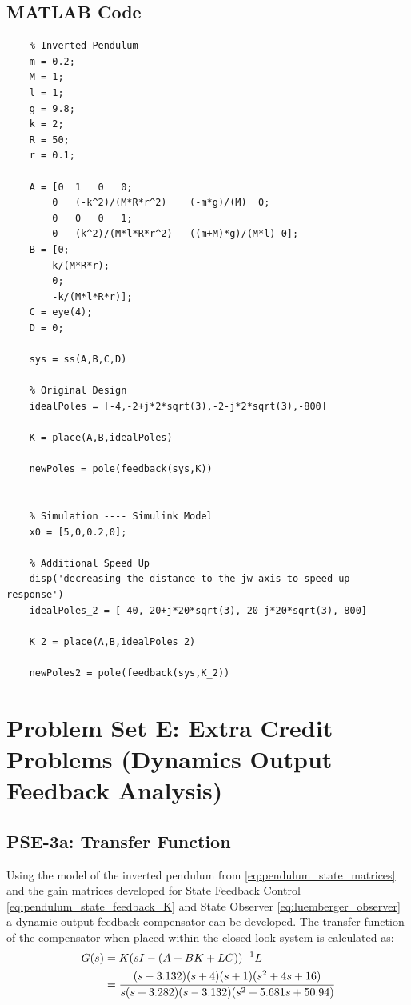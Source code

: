 \documentclass[]{article}
\begin{document}
	\subsection{MATLAB Code}
		\label{apx:PSD_MATLAB}
		\begin{Verbatim}[tabsize=4]
	% MECH 6300 - Problem Set D
	% Inverted Pendulum
	m = 0.2;
	M = 1;
	l = 1;
	g = 9.8;
	k = 2;
	R = 50;
	r = 0.1;
	
	A = [0  1   0   0;
		0   (-k^2)/(M*R*r^2)    (-m*g)/(M)  0;
		0   0   0   1;
		0   (k^2)/(M*l*R*r^2)   ((m+M)*g)/(M*l) 0];
	B = [0;
		k/(M*R*r);
		0;
		-k/(M*l*R*r)];
	C = eye(4);
	D = 0;
	
	sys = ss(A,B,C,D)
	
	% Original Design
	idealPoles = [-4,-2+j*2*sqrt(3),-2-j*2*sqrt(3),-800]
	
	K = place(A,B,idealPoles)
	
	newPoles = pole(feedback(sys,K))
	
	
	% Simulation ---- Simulink Model
	x0 = [5,0,0.2,0];
	
	% Additional Speed Up
	disp('decreasing the distance to the jw axis to speed up response')
	idealPoles_2 = [-40,-20+j*20*sqrt(3),-20-j*20*sqrt(3),-800]
	
	K_2 = place(A,B,idealPoles_2)
	
	newPoles2 = pole(feedback(sys,K_2))
		\end{Verbatim}

\newpage
\section{Problem Set E: Extra Credit Problems (Dynamics Output Feedback Analysis)}

	\subsection{PSE-3a: Transfer Function}
		Using the model of the inverted pendulum from \eqref{eq:pendulum_state_matrices} and the gain matrices developed for State Feedback Control \eqref{eq:pendulum_state_feedback_K} and State Observer \eqref{eq:luemberger_observer} a dynamic output feedback compensator can be developed. The transfer function of the compensator when placed within the closed look system is calculated as:
		\begin{equation}
			\begin{aligned}
				G(s) &= K (sI - (A+BK+LC))^{-1} L\\
					 &= \cfrac{(s-3.132)(s+4)(s+1)(s^2+4s+16)}{s (s+3.282)(s-3.132)(s^2 + 5.681s + 50.94)}
			\end{aligned}
		\end{equation}
	
\end{document}
